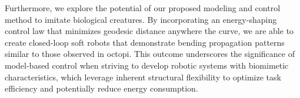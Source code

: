 Furthermore, we explore the potential of our proposed modeling and control method to imitate biological creatures. By incorporating an energy-shaping control law that minimizes geodesic distance anywhere the curve, we are able to create closed-loop soft robots that demonstrate bending propagation patterns similar to those observed in octopi. This outcome underscores the significance of model-based control when striving to develop robotic systems with biomimetic characteristics, which leverage inherent structural flexibility to optimize task efficiency and potentially reduce energy consumption.

